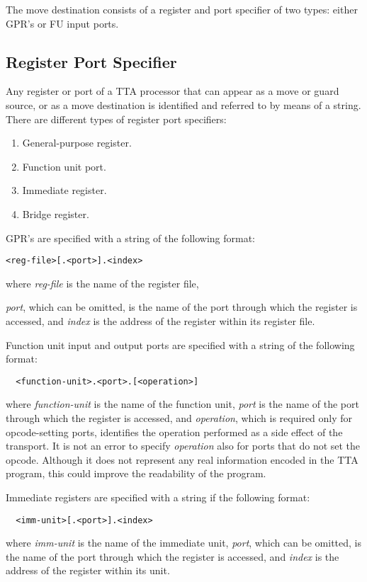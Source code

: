 \documentclass[twoside]{tceusermanual}
\begin{document}
The move destination consists of a register and port specifier of two types:
either GPR's or FU input ports.

\subsection{Register Port Specifier}
\label{ssec:move-terminal}

Any register or port of a TTA processor that can appear as a move or guard
source, or as a move destination is identified and referred to by means of a
string.
%
There are different types of register port specifiers:
\begin{enumerate}
\item %
  General-purpose register.
\item %
  Function unit port.
\item %
  Immediate register.
\item %
  Bridge register.
\end{enumerate}

GPR's are specified with a string of the following format:
\begin{verbatim}
<reg-file>[.<port>].<index>
\end{verbatim}

where \emph{reg-file} is the name of the register file,

\emph{port}, which can be omitted, is the name of the port through which the
register is accessed, and \emph{index} is the address of the register within
its register file.

Function unit input and output ports are specified with a string of the
following format:

\begin{verbatim}
  <function-unit>.<port>.[<operation>]
\end{verbatim}

where \emph{function-unit} is the name of the function unit, \emph{port} is
the name of the port through which the register is accessed, and
\emph{operation}, which is required only for opcode-setting ports,
identifies the operation performed as a side effect of the transport.
%
It is not an error to specify \emph{operation} also for ports that do not
set the opcode.  Although it does not represent any real information encoded
in the TTA program, this could improve the readability of the program.

Immediate registers are specified with a string if the following format:
\begin{verbatim}
  <imm-unit>[.<port>].<index>
\end{verbatim}
where \emph{imm-unit} is the name of the immediate unit,
%
%
\emph{port}, which can be omitted, is the name of the port through which the
register is accessed, and \emph{index} is the address of the register within
its unit.
\end{document}
